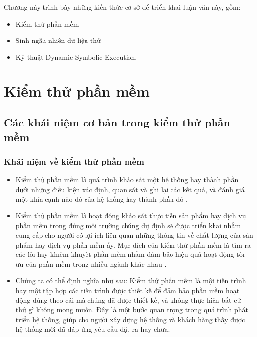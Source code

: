 Chương này trình bày những kiến thức cơ sở để triển khai luận văn này, gồm:
\begin{itemize}
\item Kiểm thử phần mềm
\item Sinh ngẫu nhiên dữ liệu thử
\item Kỹ thuật Dynamic Symbolic Execution.
\end{itemize}

\section{Kiểm thử phần mềm}
	\subsection{Các khái niệm cơ bản trong kiểm thử phần mềm}
	\subsubsection{Khái niệm về kiểm thử phần mềm}
	\begin{itemize}
		\item Kiểm thử phần mềm là quá trình khảo sát một hệ thống hay thành phần dưới những điều kiện xác định, quan sát và ghi lại các kết quả, và đánh giá một khía cạnh nào đó của hệ thống hay thành phần đó \cite{radatz1990ieee}.
		
		\item Kiểm thử phần mềm là hoạt động khảo sát thực tiễn sản phẩm hay dịch vụ phần mềm trong đúng môi trường chúng dự định sẽ được triển khai nhằm cung cấp cho người có lợi ích liên quan những thông tin về chất lượng của sản phẩm hay dịch vụ phần mềm ấy. Mục đích của kiểm thử phần mềm là tìm ra các lỗi hay khiếm khuyết phần mềm nhằm đảm bảo hiệu quả hoạt động tối ưu của phần mềm trong nhiều ngành khác nhau \cite{wikipedia}.
		
		\item Chúng ta có thể định nghĩa như sau: Kiểm thử phần mềm là một tiến trình hay một tập hợp các tiến trình được thiết kế để đảm bảo phần mềm hoạt động đúng theo cái mà chúng đã được thiết kế, và không thực hiện bất cứ thứ gì không mong muốn. Đây là một bước quan trọng trong quá trình phát triển hệ thống, giúp cho người xây dựng hệ thống và khách hàng thấy được hệ thống mới đã đáp ứng yêu cầu đặt ra hay chưa.
	\end{itemize}

